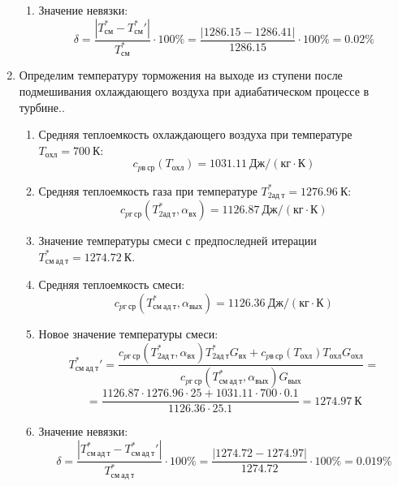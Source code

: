 \documentclass[a4paper,10pt]{article}
\begin{document}
\begin{enumerate}
\begin{enumerate}
            \item Значение невязки:
            \[
                \delta = \frac{ \left| T_{см}^{*} - T_{см}^*\prime \right| }{T_{см}^{*}} \cdot 100 \% =
                    \frac{
                        \left| 1286.15 - 1286.41 \right|
                    }{
                        1286.15
                    } \cdot 100 \% =
                0.02 \%
            \]
        \end{enumerate}


        \item Определим температуру торможения на выходе из ступени после подмешивания охлаждающего воздуха при адиабатическом процессе в турбине..
        \begin{enumerate}

            \item Средняя теплоемкость охлаждающего воздуха при температуре $T_{охл} = 700\ К $:
            \[
                c_{pв\ ср} (T_{охл}) = 1031.11\ Дж/ (кг \cdot К)
            \]

            \item Средняя теплоемкость газа при температуре $T_{2ад\ т}^* = 1276.96 \ К $:
            \[
                c_{pг\ ср} (T_{2ад\ т}^*, \alpha_{вх}) =
                1126.87\ Дж/ (кг \cdot К)
            \]

            \item Значение температуры смеси с предпоследней итерации $T_{см\ ад\ т}^{*} = 1274.72\ К$.

            \item Средняя теплоемкость смеси:
            \[
                c_{pг\ ср} (T_{см\ ад\ т}^{*}, \alpha_{вых}) =
                1126.36\ Дж/ (кг \cdot К)
            \]

            \item Новое значение температуры смеси:
            \[
                T_{см\ ад\ т}^*\prime = \frac{
                        c_{pг\ ср} (T_{2ад\ т}^*, \alpha_{вх}) T_{2ад\ т}^* G_{вх} + c_{pв\ ср} (T_{охл}) T_{охл} G_{охл}
                    }{
                        c_{pг\ ср} (T_{см\ ад\ т}^{*}, \alpha_{вых}) G_{вых}
                    } =
            \]
            \[    = \frac{
                    1126.87
                    \cdot 1276.96 \cdot 25 +
                    1031.11
                    \cdot 700 \cdot 0.1
                }{
                    1126.36
                    \cdot  25.1
                } =
                1274.97\ К
            \]

            \item Значение невязки:
            \[
                \delta = \frac{ \left| T_{см\ ад\ т}^{*} - T_{см\ ад\ т}^*\prime \right| }{T_{см\ ад\ т}^{*}} \cdot 100 \% =
                    \frac{
                        \left| 1274.72 - 1274.97 \right|
                    }{
                        1274.72
                    } \cdot 100 \% =
                0.019 \%
            \]
        \end{enumerate}

        

    \end{enumerate}
    
\end{document}
